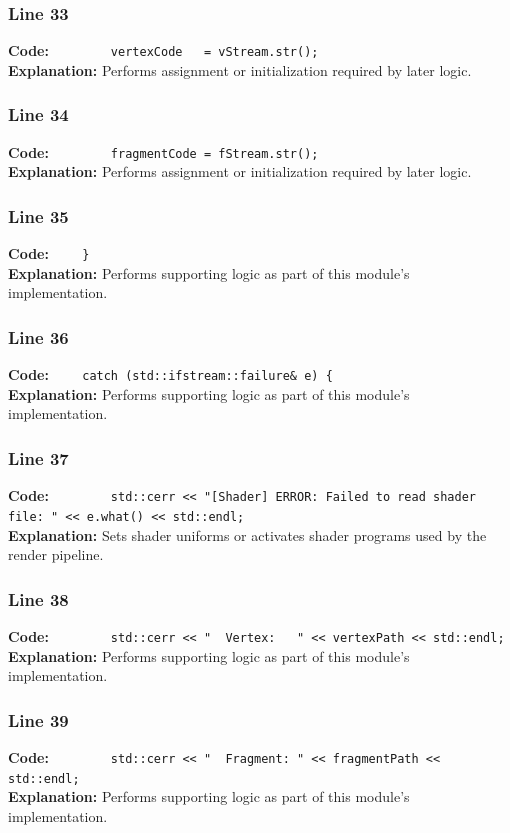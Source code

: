 \documentclass[11pt,a4paper]{article}
\begin{document}
\subsubsection*{Line 33}
\textbf{Code:} \verb|        vertexCode   = vStream.str();|\\
\textbf{Explanation:} Performs assignment or initialization required by later logic.

\subsubsection*{Line 34}
\textbf{Code:} \verb|        fragmentCode = fStream.str();|\\
\textbf{Explanation:} Performs assignment or initialization required by later logic.

\subsubsection*{Line 35}
\textbf{Code:} \verb|    }|\\
\textbf{Explanation:} Performs supporting logic as part of this module's implementation.

\subsubsection*{Line 36}
\textbf{Code:} \verb|    catch (std::ifstream::failure& e) {|\\
\textbf{Explanation:} Performs supporting logic as part of this module's implementation.

\subsubsection*{Line 37}
\textbf{Code:} \verb|        std::cerr << "[Shader] ERROR: Failed to read shader file: " << e.what() << std::endl;|\\
\textbf{Explanation:} Sets shader uniforms or activates shader programs used by the render pipeline.

\subsubsection*{Line 38}
\textbf{Code:} \verb|        std::cerr << "  Vertex:   " << vertexPath << std::endl;|\\
\textbf{Explanation:} Performs supporting logic as part of this module's implementation.

\subsubsection*{Line 39}
\textbf{Code:} \verb|        std::cerr << "  Fragment: " << fragmentPath << std::endl;|\\
\textbf{Explanation:} Performs supporting logic as part of this module's implementation.
\end{document}
